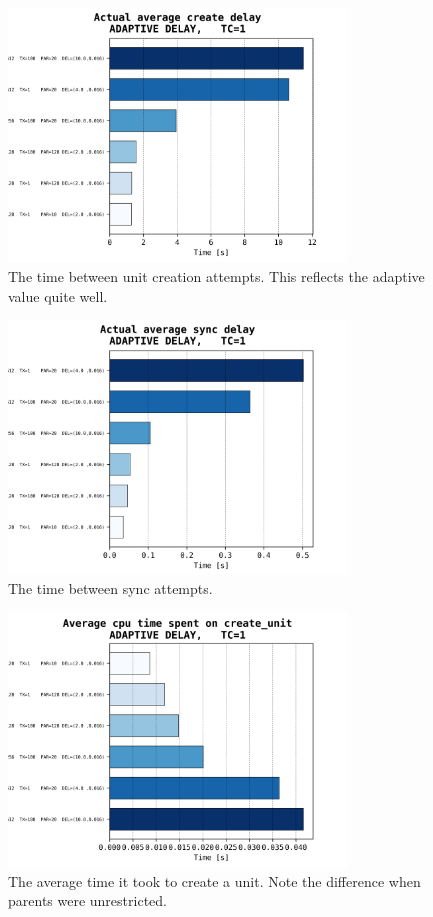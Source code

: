 \documentclass[a4paper,10pt]{article}
\begin{document}
			\begin{figure}[h]
				\centering
				\includegraphics[width=0.8\textwidth]{bar_plots/big/create_delay.png}
				\caption{The time between unit creation attempts. This reflects the adaptive value quite well.}
				\label{fig:bigCreateDelay}
			\end{figure}
			\begin{figure}[h]
				\centering
				\includegraphics[width=0.8\textwidth]{bar_plots/big/sync_delay.png}
				\caption{The time between sync attempts.}
				\label{fig:bigSyncDelay}
			\end{figure}
			\begin{figure}[h]
				\centering
				\includegraphics[width=0.8\textwidth]{bar_plots/big/time_create.png}
				\caption{The average time it took to create a unit. Note the difference when parents were unrestricted.}
				\label{fig:bigTimeCreate}
			\end{figure}
\end{document}
